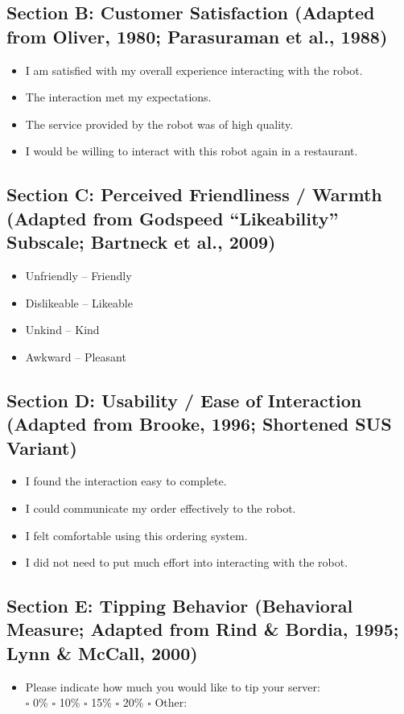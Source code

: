 \documentclass[conference]{IEEEtran}
\begin{document}
\subsection{Section B: Customer Satisfaction (Adapted from Oliver, 1980; Parasuraman et al., 1988)}
\begin{itemize}
\item I am satisfied with my overall experience interacting with the robot.
\item The interaction met my expectations.
\item The service provided by the robot was of high quality.
\item I would be willing to interact with this robot again in a restaurant.
\end{itemize}

\subsection{Section C: Perceived Friendliness / Warmth (Adapted from Godspeed “Likeability” Subscale; Bartneck et al., 2009)}
\begin{itemize}
\item Unfriendly – Friendly
\item Dislikeable – Likeable
\item Unkind – Kind
\item Awkward – Pleasant
\end{itemize}

\subsection{Section D: Usability / Ease of Interaction (Adapted from Brooke, 1996; Shortened SUS Variant)}
\begin{itemize}
\item I found the interaction easy to complete.
\item I could communicate my order effectively to the robot.
\item I felt comfortable using this ordering system.
\item I did not need to put much effort into interacting with the robot.
\end{itemize}

\subsection{Section E: Tipping Behavior (Behavioral Measure; Adapted from Rind \& Bordia, 1995; Lynn \& McCall, 2000)}
\begin{itemize}
\item Please indicate how much you would like to tip your server: \\
$\square$ 0\% \quad $\square$ 10\% \quad $\square$ 15\% \quad $\square$ 20\% \quad $\square$ Other: \underline{\hspace{1.8cm}}
\end{itemize}
\end{document}
